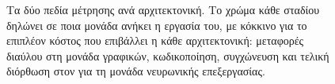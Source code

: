 \begin{figure}[H]
\begin{tikzpicture}[x=1.0cm, y=1.0cm]
    \end{tikzpicture}
    \caption[Τα δύο πεδία μέτρησης ανά αρχιτεκτονική]{Τα δύο πεδία μέτρησης ανά αρχιτεκτονική. Το χρώμα κάθε σταδίου
    δηλώνει σε ποια μονάδα ανήκει η εργασία του, με κόκκινο για το επιπλέον κόστος
    που επιβάλλει η κάθε αρχιτεκτονική: μεταφορές διαύλου στη μονάδα γραφικών,
    κωδικοποίηση, συγχώνευση και τελική διόρθωση στον  για τη μονάδα
    νευρωνικής επεξεργασίας.}
    \label{fig:meth-scopes}
\end{figure}
